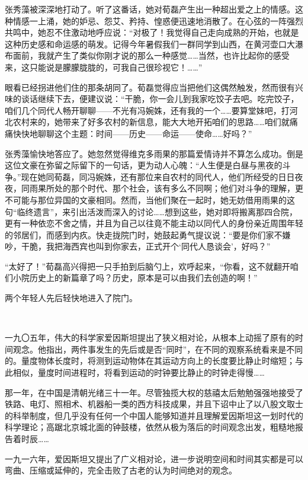 \par 张秀藻被深深地打动了。听了这番话，她对荀磊产生出一种超出爱之上的情感。这种情感一上涌，她的妒忌、怨艾、矜持、惶惑便迅速地消散了。在心弦的一阵强烈共鸣中，她忍不住激动地呼应说：“对极了！我觉得自己走向成熟的开始，也就是这种历史感和命运感的萌发。记得今年暑假我们一群同学到山西，在黄河壶口大瀑布面前，我就产生了类似你刚才说的那么一种感觉……当然，也许比起你的感受来，这只能说是朦朦胧胧的，可我自己很珍视它！……”
\par 眼看已经拐进他们住的那条胡同了。荀磊觉得应当把他们这偶然触发，然而很有兴味的谈话继续下去，便建议说：“干脆，你一会儿到我家吃饺子去吧。吃完饺子，咱们几个同代人畅开聊聊——不光有冯婉姝，还有我的一个……要算堂妹吧，打河北农村来的，她带来了好多农村的新信息，能大大地开拓咱们的思路……咱们就痛痛快快地聊聊这个主题：时间——历史——命运——使命……好吗？”
\par 张秀藻愉快地答应了。她忽然觉得维克多雨果的那篇爱情诗并不算怎么成功。倒是这位文豪在弥留之际留下的一句话，更为动人心魄：“人生便是白昼与黑夜的斗争。”现在她同荀磊，同冯婉姝，还有那位来自农村的同代人，他们所经受的日日夜夜，同雨果所处的那个时代、那个社会，该有多么不同啊；他们对斗争的理解，更不可能与那位异国的文豪相同。然而，当他们聚在一起时，她无妨借用雨果的这句“临终遗言”，来引出活泼而深入的讨论……想到这些，她对即将搬离那四合院，更有一种依恋不舍之情，并且为自己以往竟不能主动以同代人的身份亲近周围年轻的邻居们，而感到内疚。快走拢院门时，她鼓起勇气提议说：“要是你们家不嫌吵，干脆，我把海西宾也叫到你家去，正式开个‘同代人恳谈会’，好吗？”
\par “太好了！”荀磊高兴得把一只手拍到后脑勺上，欢呼起来，“你看，这不就翻开咱们小院历史上的新篇章了吗？历史，原本是可以由我们去创造的啊！”
\par 两个年轻人先后轻快地进入了院门。
\par  
\par 一九〇五年，伟大的科学家爱因斯坦提出了狭义相对论，从根本上动摇了原有的时间观念。他指出，两件事发生的先后或是否“同时”，在不同的观察系统看来是不同的。量度物体长度时，将测到运动物体在其运动方向上的长度要比静止时缩短；与此相似，量度时间进程时，将看到运动的时钟要比静止的时钟走得慢……
\par 那一年，在中国是清朝光绪三十一年。尽管独揽大权的慈禧太后勉勉强强地接受了铁路、电灯、照相术、机器船一类的西方科技成果，并且下诏中止了以八股文取士的科举制度，但几乎没有任何一个中国人能够知道并且理解爱因斯坦这一划时代的科学理论；高踞北京城北面的钟鼓楼，依然从极为落后的时间观念出发，粗糙地报告着时辰……
\par 一九一六年，爱因斯坦又提出了广义相对论，进一步说明空间和时间其实都是可以弯曲、压缩或延伸的，完全击败了古老的认为时间绝对的观念。
